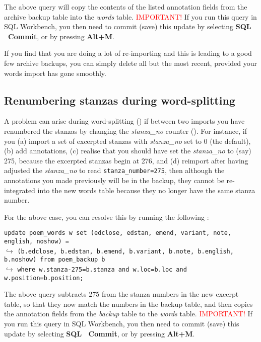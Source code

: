 The above query will copy the contents of the listed annotation fields from the archive backup table into the \textit{words} table.  \textcolor{red}{IMPORTANT!} If you run this query in SQL Workbench, you then need to commit (save) this update by selecting \textbf{SQL \textrightarrow\ Commit}, or by pressing \textbf{Alt+M}.

If you find that you are doing a lot of re-importing and this is leading to a good few archive backups, you can simply delete all but the most recent, provided your words import has gone smoothly.

\subsection{Renumbering stanzas during word-splitting}
\label{ss:renumber}

A problem can arise during word-splitting () if between two imports you have renumbered the stanzas by changing the \textit{stanza_no} counter ().  For instance, if you (a) import a set of excerpted stanzas with \textit{stanza_no} set to 0 (the default), (b) add annotations, (c) realise that you should have set the \textit{stanza_no} to (say) 275, because the excerpted stanzas begin at 276, and (d) reimport after having adjusted the \textit{stanza_no} to read \verb|stanza_number=275|, then although the annotations you made previously will be in the backup, they cannot be re-integrated into the new words table because they no longer have the same stanza number. 

For the above case, you can resolve this by running the following :

\verb|update poem_words w set (edclose, edstan, emend, variant, note, english, noshow) = |\\
$\hookrightarrow$ \verb|(b.edclose, b.edstan, b.emend, b.variant, b.note, b.english, b.noshow) from poem_backup b|\\
$\hookrightarrow$ \verb|where w.stanza-275=b.stanza and w.loc=b.loc and w.position=b.position;|

The above query subtracts 275 from the stanza numbers in the new excerpt table, so that they now match the numbers in the backup table, and then copies the annotation fields from the \textit{backup} table to the \textit{words} table.  \textcolor{red}{IMPORTANT!} If you run this query in SQL Workbench, you then need to commit (save) this update by selecting \textbf{SQL \textrightarrow\ Commit}, or by pressing \textbf{Alt+M}.


